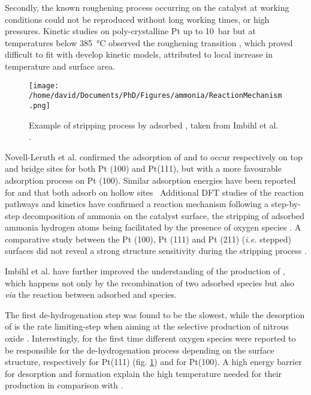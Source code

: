 Secondly, the known roughening process occurring on the catalyst at working conditions could not be reproduced without long working times, or high pressures.
Kinetic studies on poly-crystalline Pt up to \qty{10}{\bar} but at temperatures below \qty{385}{\degreeCelsius} observed the roughening transition \parencite{Kraehnert2008}, which proved difficult to fit with develop kinetic models, attributed to local increase in temperature and surface area.


\begin{figure}[!htb]
    \centering
    \texttt{[image: /home/david/Documents/PhD/Figures/ammonia/ReactionMechanism.png]}
    \caption{
    Example of  stripping process by adsorbed , taken from Imbihl et al. \parencite*{Imbihl2007}.
    }
    \label{fig:ReactionMechanism}
\end{figure}

Novell-Leruth et al. \parencite*{NovellLeruth2005} confirmed the adsorption of  and  to occur respectively on top and bridge sites for both Pt (100) and Pt(111), but with a more favourable adsorption process on Pt (100).
Similar adsorption energies have been reported for  and  that both adsorb on hollow sites \
Additional DFT studies of the reaction pathways and kinetics have confirmed a reaction mechanism following a step-by-step decomposition of ammonia on the catalyst surface, the stripping of adsorbed ammonia hydrogen atoms being facilitated by the presence of oxygen species \parencite{Offermans2006}.
A comparative study between the Pt (100), Pt (111) and Pt (211) (\textit{i.e.} stepped) surfaces did not reveal a strong structure sensitivity during the \ce{NH_3} stripping process \parencite{Offermans2007}.

Imbihl et al. \parencite*{Imbihl2007} have further improved the understanding of the production of , which happens not only by the recombination of two adsorbed  species but also \textit{via} the reaction between adsorbed  and  species.

The first de-hydrogenation step was found to be the slowest, while the desorption of  is the rate limiting-step when aiming at the selective production of nitrous oxide \parencite{NovellLeruth2008}.
Interestingly, for the first time different oxygen species were reported to be responsible for the de-hydrogenation process depending on the surface structure, respectively \ce{O} for Pt(111) (fig. \ref{fig:ReactionMechanism}) and  for Pt(100).
A high energy barrier for \ce{NO} desorption and \ce{N_2O} formation explain the high temperature needed for their production in comparison with \ce{N_2}.

